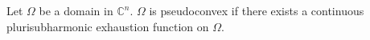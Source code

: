 
Let $\Omega$ be a domain in $\mathbb{C}^n$. $\Omega$ is pseudoconvex if there exists a continuous plurisubharmonic exhaustion function on $\Omega$.
